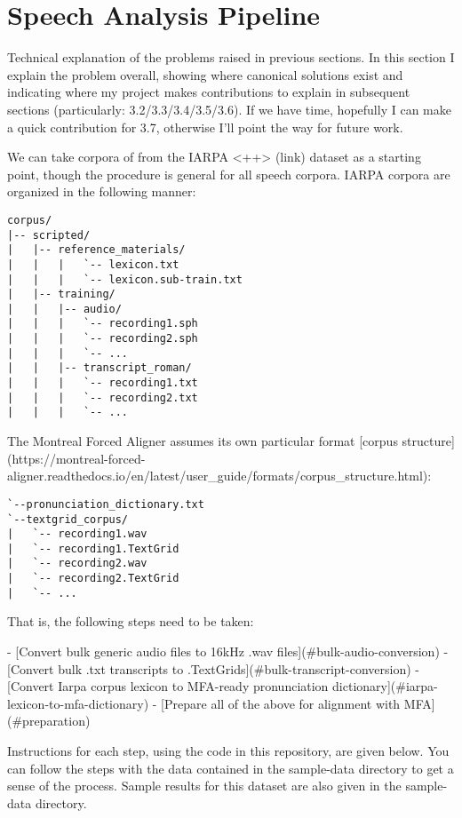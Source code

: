 \documentclass[twoside,11pt]{article}
\begin{document}
\section{Speech Analysis Pipeline}

Technical explanation of the problems raised in previous sections. In this section I explain the problem overall, showing where canonical solutions exist and indicating where my project makes contributions to explain in subsequent sections (particularly: 3.2/3.3/3.4/3.5/3.6). If we have time, hopefully I can make a quick contribution for 3.7, otherwise I'll point the way for future work.

We can take corpora of from the IARPA <++> (link) dataset as a starting point, though the procedure is general for all speech corpora. IARPA corpora are organized in the following manner:

\begin{verbatim}
corpus/
|-- scripted/
|   |-- reference_materials/
|   |   |   `-- lexicon.txt
|   |   |   `-- lexicon.sub-train.txt
|   |-- training/
|   |   |-- audio/
|   |   |   `-- recording1.sph
|   |   |   `-- recording2.sph
|   |   |   `-- ...
|   |   |-- transcript_roman/
|   |   |   `-- recording1.txt
|   |   |   `-- recording2.txt
|   |   |   `-- ...
\end{verbatim}

The Montreal Forced Aligner assumes its own particular format [corpus structure](https://montreal-forced-aligner.readthedocs.io/en/latest/user_guide/formats/corpus_structure.html):

\begin{verbatim}
`--pronunciation_dictionary.txt
`--textgrid_corpus/
|   `-- recording1.wav
|   `-- recording1.TextGrid
|   `-- recording2.wav
|   `-- recording2.TextGrid
|   `-- ...
\end{verbatim}

That is, the following steps need to be taken:

- [Convert bulk generic audio files to 16kHz .wav files](#bulk-audio-conversion)
- [Convert bulk .txt transcripts to .TextGrids](#bulk-transcript-conversion)
- [Convert Iarpa corpus lexicon to MFA-ready pronunciation dictionary](#iarpa-lexicon-to-mfa-dictionary)
- [Prepare all of the above for alignment with MFA](#preparation)

Instructions for each step, using the code in this repository, are given below. You can follow the steps with the data contained in the sample-data directory to get a sense of the process. Sample results for this dataset are also given in the sample-data directory.
\end{document}
